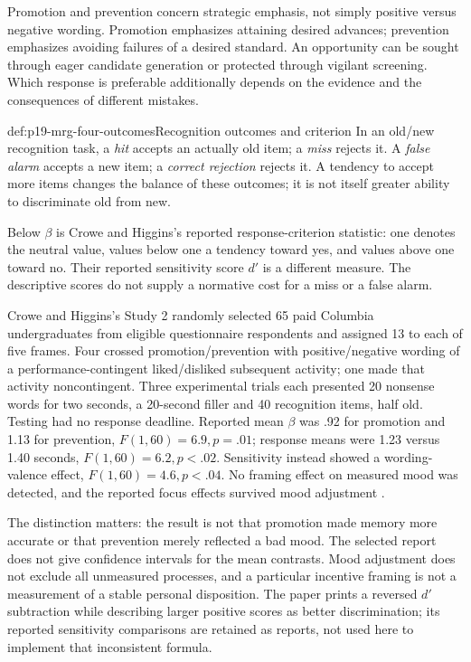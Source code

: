 Promotion and prevention concern strategic emphasis, not simply positive
versus negative wording. Promotion emphasizes attaining desired advances;
prevention emphasizes avoiding failures of a desired standard. An opportunity
can be sought through eager candidate generation or protected through
vigilant screening. Which response is preferable additionally depends on
the evidence and the consequences of different mistakes.

\begin{hbdefinition}{def:p19-mrg-four-outcomes}{Recognition outcomes and criterion}
In an old/new recognition task, a \emph{hit} accepts an actually old item;
a \emph{miss} rejects it. A \emph{false alarm} accepts a new item;
a \emph{correct rejection} rejects it. A tendency to accept more items
changes the balance of these outcomes; it is not itself greater ability
to discriminate old from new.

Below \(\beta\) is Crowe and Higgins's reported response-criterion statistic:
one denotes the neutral value, values below one a tendency toward yes,
and values above one toward no. Their reported sensitivity score
\(d'\) is a different measure. The descriptive scores do not supply a
normative cost for a miss or a false alarm.
\end{hbdefinition}

Crowe and Higgins's Study 2 randomly selected 65 paid Columbia
undergraduates from eligible questionnaire respondents and assigned 13 to
each of five frames. Four crossed promotion/prevention with positive/negative
wording of a performance-contingent liked/disliked subsequent activity;
one made that activity noncontingent. Three experimental trials each presented
20 nonsense words for two seconds, a 20-second filler and 40 recognition
items, half old. Testing had no response deadline.
Reported mean \(\beta\) was .92 for promotion and 1.13 for prevention,
\(F(1,60)=6.9,p=.01\); response means were 1.23 versus 1.40 seconds,
\(F(1,60)=6.2,p<.02\).
Sensitivity instead showed a wording-valence effect,
\(F(1,60)=4.6,p<.04\).
No framing effect on measured mood was detected, and the reported focus
effects survived mood adjustment
\cite[pp.~127--130]{CroweHiggins1997StrategyMRG}.

The distinction matters: the result is not that promotion made memory more
accurate or that prevention merely reflected a bad mood. The selected report
does not give confidence intervals for the mean contrasts. Mood adjustment
does not exclude all unmeasured processes, and a particular incentive framing
is not a measurement of a stable personal disposition. The paper prints a
reversed \(d'\) subtraction while describing larger positive scores as
better discrimination; its reported sensitivity comparisons are retained
as reports, not used here to implement that inconsistent formula.

